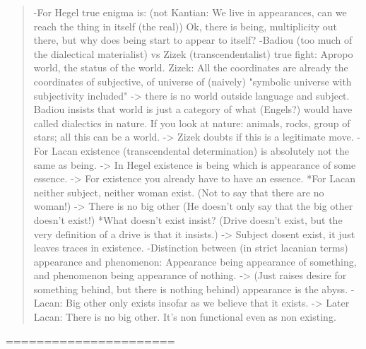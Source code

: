 \documentclass{book}
\begin{document}
\begin{quotation}
-For Hegel true enigma is: (not Kantian: We live in appearances, can we reach the thing in itself (the real)) Ok, there is being, multiplicity out there, but why does being start to appear to itself?
-Badiou (too much of the dialectical materialist) vs Zizek (transcendentalist) true fight: Apropo world, the status of the world. Zizek: All the coordinates are already the coordinates of subjective, of universe of (naively) "symbolic universe with subjectivity included" -> there is no world outside language and subject. Badiou insists that world is just a category of what (Engels?) would have called dialectics in nature. If you look at nature: animals, rocks, group of stars; all this can be a world. -> Zizek doubts if this is a legitimate move.
-For Lacan existence (transcendental determination) is absolutely not the same as being. -> In Hegel existence is being which is appearance of some essence. -> For existence you already have to have an essence. 
	*For Lacan neither subject, neither woman exist. (Not to say that there are no woman!) -> There is no big other (He doesn't only say that the big other doesn't exist!) 
	*What doesn't exist insist? (Drive doesn't exist, but the very definition of a drive is that it insists.) -> Subject dosent exist, it just leaves traces in existence.
-Distinction between (in strict lacanian terms) appearance and phenomenon: Appearance being appearance of something, and phenomenon being appearance of nothing. -> (Just raises desire for something behind, but there is nothing behind) appearance is the abyss.
-Lacan: Big other only exists insofar as we believe that it exists. -> Later Lacan: There is no big other. It's non functional even as non existing.
\end{quotation}
======================
\end{document}
